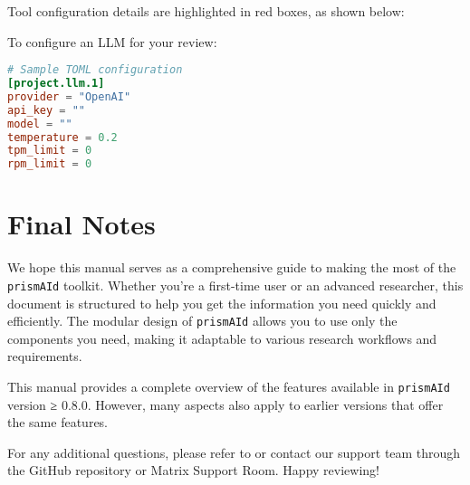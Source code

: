 Tool configuration details are highlighted in red boxes, as shown below:

\begin{configbox}
To configure an LLM for your review:
\begin{lstlisting}[language=TOML]
# Sample TOML configuration
[project.llm.1]
provider = "OpenAI"
api_key = ""
model = ""
temperature = 0.2
tpm_limit = 0
rpm_limit = 0
\end{lstlisting}
\end{configbox}


\section*{Final Notes}

We hope this manual serves as a comprehensive guide to making the most of the \texttt{prismAId} toolkit. Whether you're a first-time user or an advanced researcher, this document is structured to help you get the information you need quickly and efficiently. The modular design of \texttt{prismAId} allows you to use only the components you need, making it adaptable to various research workflows and requirements.

This manual provides a complete overview of the features available in \texttt{prismAId} version ≥ 0.8.0. However, many aspects also apply to earlier versions that offer the same features.

For any additional questions, please refer to  or contact our support team through the GitHub repository or Matrix Support Room. Happy reviewing!
